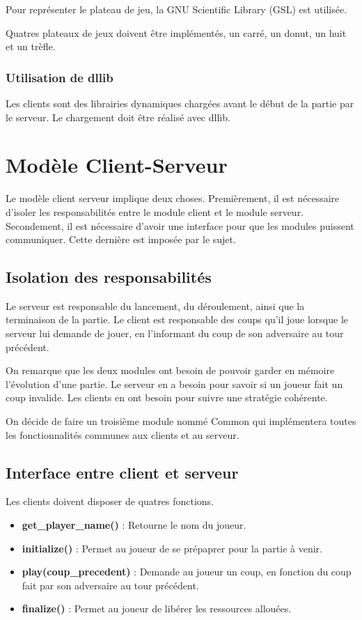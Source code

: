 \documentclass{article}
\begin{document}
Pour repr\'esenter le plateau de jeu, la GNU Scientific Library (GSL) est utilis\'ee.

Quatres plateaux de jeux doivent \^etre impl\'ement\'es, un carré, un donut, un huit et un tr\`efle.

\subsubsection{Utilisation de dllib}

Les clients sont des librairies dynamiques charg\'ees avant le d\'ebut de la partie par le serveur.
Le chargement doit \^etre r\'ealis\'e avec dllib.

\section{Mod\`ele Client-Serveur}

Le mod\`ele client serveur implique deux choses.
Premi\`erement, il est n\'ecessaire d'isoler les responsabilit\'es entre le module client et le module serveur.
Secondement, il est n\'ecessaire d'avoir une interface pour que les modules puissent communiquer.
Cette derni\`ere est impos\'ee par le sujet.

\subsection{Isolation des responsabilit\'es}

Le serveur est responsable du lancement, du d\'eroulement, ainsi que la terminaison de la partie.
Le client est responsable des coups qu'il joue lorsque le serveur lui demande de jouer, 
en l'informant du coup de son adversaire au tour pr\'ec\'edent.

On remarque que les deux modules ont besoin de pouvoir garder en m\'emoire l'\'evolution d'une partie.
Le serveur en a besoin pour savoir si un joueur fait un coup invalide.
Les clients en ont besoin pour suivre une strat\'egie coh\'erente.

On d\'ecide de faire un troisi\`eme module nomm\'e Common qui impl\'ementera toutes les fonctionnalit\'es communes 
aux clients et au serveur.

\subsection{Interface entre client et serveur}

Les clients doivent disposer de quatres fonctions.
\begin{itemize}
    \item \textbf{get\_player\_name()} : Retourne le nom du joueur.
    \item \textbf{initialize()} : Permet au joueur de se pr\'epaprer pour la partie \`a venir.
    \item \textbf{play(coup\_precedent)} : Demande au joueur un coup, en fonction 
    du coup fait par son adversaire au tour pr\'ec\'edent.
    \item \textbf{finalize()} : Permet au joueur de lib\'erer les ressources allou\'ees.
\end{itemize}
\end{document}
